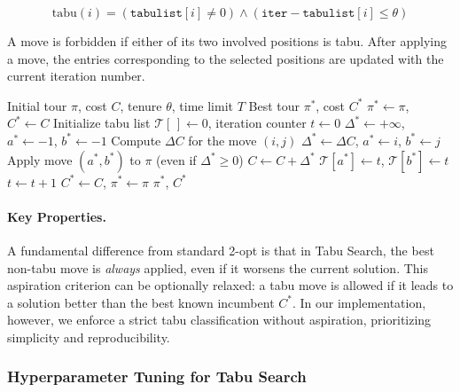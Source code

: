 \documentclass{article}
\begin{document}
\[
\text{tabu}(i) = (\texttt{tabulist}[i] \neq 0) \land (\texttt{iter} - \texttt{tabulist}[i] \leq \theta)
\]

A move is forbidden if either of its two involved positions is tabu. After applying a move,
the entries corresponding to the selected positions are updated with the current iteration
number.

\begin{algorithm}[H]
\caption{Tabu Search for TSP (2-opt moves)}
\label{alg:tabu}
\begin{algorithmic}[1]
\Require Initial tour $\pi$, cost $C$, tenure $\theta$, time limit $T$
\Ensure Best tour $\pi^*$, cost $C^*$
\State $\pi^* \leftarrow \pi$, $C^* \leftarrow C$
\State Initialize tabu list $\mathcal{T}[\,] \leftarrow 0$, iteration counter $t \leftarrow 0$
    \State $\Delta^* \leftarrow +\infty$, $a^* \leftarrow -1$, $b^* \leftarrow -1$
        \State Compute $\Delta C$ for the move $(i, j)$
            \State $\Delta^* \leftarrow \Delta C$, $a^* \leftarrow i$, $b^* \leftarrow j$
        \EndIf
    \EndFor
    \State Apply move $(a^*, b^*)$ to $\pi$ (even if $\Delta^* \geq 0$)
    \State $C \leftarrow C + \Delta^*$
    \State $\mathcal{T}[a^*] \leftarrow t$, $\mathcal{T}[b^*] \leftarrow t$
    \State $t \leftarrow t + 1$
        \State $C^* \leftarrow C$, $\pi^* \leftarrow \pi$
    \EndIf
\EndWhile
\State \Return $\pi^*$, $C^*$
\end{algorithmic}
\end{algorithm}

\paragraph{Key Properties.}
A fundamental difference from standard 2-opt is that in Tabu Search, the best non-tabu
move is \textit{always} applied, even if it worsens the current solution. This aspiration
criterion can be optionally relaxed: a tabu move is allowed if it leads to a solution better
than the best known incumbent $C^*$. In our implementation, however, we enforce a strict
tabu classification without aspiration, prioritizing simplicity and reproducibility.

\subsubsection{Hyperparameter Tuning for Tabu Search}
\end{document}
